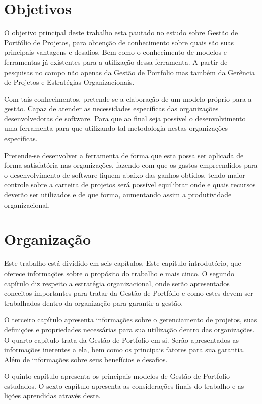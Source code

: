 \documentclass[12pt,a4paper,ruledheader,tocpage=prefix,floatnumber=continuous,pagestart=folhaderosto,font=times]{abnt}
\begin{document}
\section{Objetivos}
O objetivo principal deste trabalho esta pautado no estudo sobre Gestão de Portfólio de Projetos, para obtenção de conhecimento sobre quais são suas principais
vantagens e desafios. Bem como o conhecimento de modelos e ferramentas já existentes para a utilização dessa ferramenta. A partir de pesquisas no campo não
apenas da Gestão de Portfolio mas também da Gerência de Projetos e Estratégias Organizacionais.

Com tais conhecimentos, pretende-se a elaboração de um modelo próprio para a gestão. Capaz de atender as necessidades específicas das organizações desenvolvedoras
de software. Para que ao final seja possível o desenvolvimento uma ferramenta para que utilizando tal metodologia nestas organizações específicas.

Pretende-se desenvolver a ferramenta de forma que esta possa ser aplicada de forma satisfatória nas organizações, fazendo com que os gastos
empreendidos para o desenvolvimento de software fiquem abaixo das ganhos obtidos, tendo maior controle sobre a carteira de projetos será possível
equilibrar onde e quais recursos deverão ser utilizados e de que forma, aumentando assim a produtividade organizacional.

\section{Organização}
Este trabalho está dividido em seis capítulos. Este capítulo introdutório, que oferece informações sobre o propósito do trabalho e mais cinco.
O segundo capítulo diz respeito a estratégia organizacional, onde serão apresentados conceitos importantes para tratar da Gestão de Portfólio e como estes
devem ser trabalhados dentro da organização para garantir a gestão.

O terceiro capítulo apresenta informações sobre o gerenciamento de projetos, suas definições e propriedades necessárias para sua utilização dentro das 
organizações. O quarto capítulo trata da Gestão de Portfolio em si. Serão apresentados as informações inerentes a ela, bem como os principais fatores para sua
garantia. Além de informações sobre seus benefícios e desafios.

O quinto capítulo apresenta os principais modelos de Gestão de Portfolio estudados. O sexto capítulo apresenta as considerações finais do trabalho e as lições
aprendidas através deste.
\end{document}
